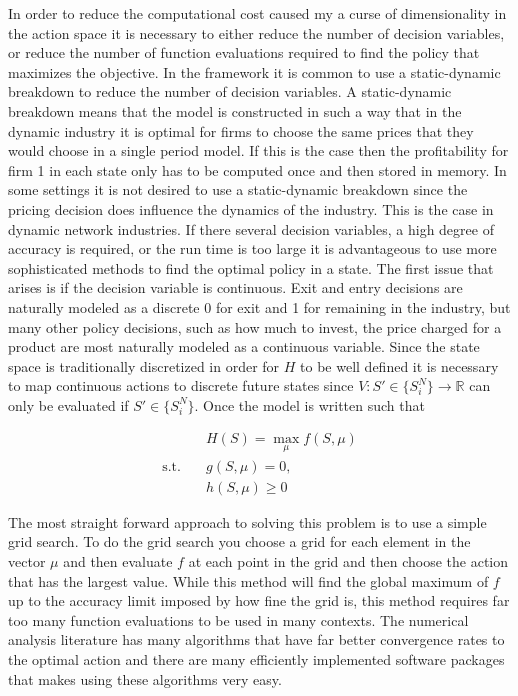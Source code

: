 \documentclass[12pt]{article}
\begin{document}
In order to reduce the computational cost caused my a curse of dimensionality in the action space it is necessary to either reduce the number of decision variables, or reduce the number of function evaluations required to find the policy that maximizes the objective. In the \citet{1995_Erickson_Pakes_RES} framework it is common to use a static-dynamic breakdown to reduce the number of decision variables. A static-dynamic breakdown means that the model is constructed in such a way that in the dynamic industry it is optimal for firms to choose the same prices that they would choose in a single period model. If this is the case then the profitability for firm 1 in each state only has to be computed once and then stored in memory. In some settings it is not desired to use a static-dynamic breakdown since the pricing decision does influence the dynamics of the industry. This is the case in dynamic network industries. %
If there several decision variables, a high degree of accuracy is required, or the run time is too large it is advantageous to use more sophisticated methods to find the optimal policy in a state. The first issue that arises is if the decision variable is continuous. Exit and entry decisions are naturally modeled as a discrete 0 for exit and 1 for remaining in the industry, but many other policy decisions, such as how much to invest, the price charged for a product are most naturally modeled as a continuous variable. Since the state space is traditionally discretized in order for $H$ to be well defined it is necessary to map continuous actions to discrete future states since $V : S' \in \{S_i^N\} \rightarrow \mathbb{R}$ can only be evaluated if $S' \in \{S_i^N\}$.
Once the model is written such that

\begin{equation*}
  \begin{aligned}
    & H(S)=\max_{\mu} f(S,\mu) \\
    \text{s.t.}\quad & g(S, \mu)=0,\\
    & h(S,\mu) \geq 0
  \end{aligned}
\end{equation*}

The most straight forward approach to solving this problem is to use a simple grid search. To do the grid search you choose a grid for each element in the vector $\mu$ and then evaluate $f$ at each point in the grid and then choose the action that has the largest value. While this method will find the global maximum of $f$ up to the accuracy limit imposed by how fine the grid is, this method requires far too many function evaluations to be used in many contexts.
The numerical analysis literature has many algorithms that have far better convergence rates to the optimal action and there are many efficiently implemented software packages that makes using these algorithms very easy.
\end{document}
